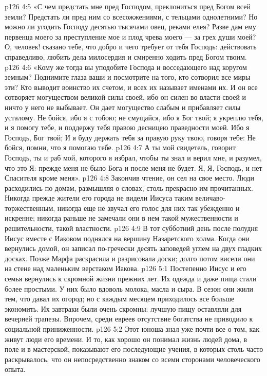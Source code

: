 \vs p126 4:5 «С чем предстать мне пред Господом, преклониться пред Богом всей земли? Предстать ли пред ним со всесожжениями, с тельцами однолетними? Но можно ли угодить Господу десятью тысячами овец, реками елея? Разве дам ему первенца моего за преступление мое и плод чрева моего --- за грех души моей? О, человек! сказано тебе, что добро и чего требует от тебя Господь: действовать справедливо, любить дела милосердия и смиренно ходить пред Богом твоим.
\vs p126 4:6 «Кому же тогда вы уподобите Господа и восседающего над коругом земным? Поднимите глаза ваши и посмотрите на того, кто сотворил все миры эти? Кто выводит воинство их счетом, и всех их называет именами их. И он все сотворяет могуществом великой силы своей, ибо он силен во власти своей и ничто у него не выбывает. Он дает могущество слабым и прибавляет силы усталому. Не бойся, ибо я с тобою; не смущайся, ибо я Бог твой; я укреплю тебя, и я помогу тебе, и поддержу тебя правою десницею праведности моей. Ибо я Господь, Бог твой; И я буду держать тебя за правую руку твою, говоря тебе: Не бойся, помни, что я помогаю тебе.
\vs p126 4:7 А ты мой свидетель, говорит Господь, ты и раб мой, которого я избрал, чтобы ты знал и верил мне, и разумел, что это Я: прежде меня не было Бога и после меня не будет. Я, Я, Господь, и нет Спасителя кроме меня».
\vs p126 4:8 \pc Закончив чтение, он сел на свое место. Люди расходились по домам, размышляя о словах, столь прекрасно им прочитанных. Никогда прежде жители его города не видели Иисуса таким величаво\hyp{}торжественным, никогда еще не звучал его голос для них так убежденно и искренне; никогда раньше не замечали они в нем такой мужественности и решительности, такой властности.
\vs p126 4:9 В тот субботний день после полудня Иисус вместе с Иаковом поднялся на вершину Назаретского холма. Когда они вернулись домой, он записал по\hyp{}гречески десять заповедей углем на двух гладких досках. Позже Марфа раскрасила и разрисовала доски; долго потом висели они на стене над маленьким верстаком Иакова.
\vs p126 5:1 Постепенно Иисус и его семья вернулись к скромной жизни прежних лет. Их одежда и даже пища стали более простыми. У них было вдоволь молока, масла и сыра. В сезон они жили тем, что давал их огород; но с каждым месяцем приходилось все больше экономить. Их завтраки были очень скромны: лучшую пищу оставляли для вечерней трапезы. Впрочем, среди евреев отсутствие богатства не приводило к социальной приниженности.
\vs p126 5:2 Этот юноша знал уже почти все о том, как живут люди его времени. И то, как хорошо он понимал жизнь людей дома, в поле и в мастерской, показывают его последующие учения, в которых столь часто раскрывалось, что он непосредственно знаком со всеми сторонами человеческого опыта.
